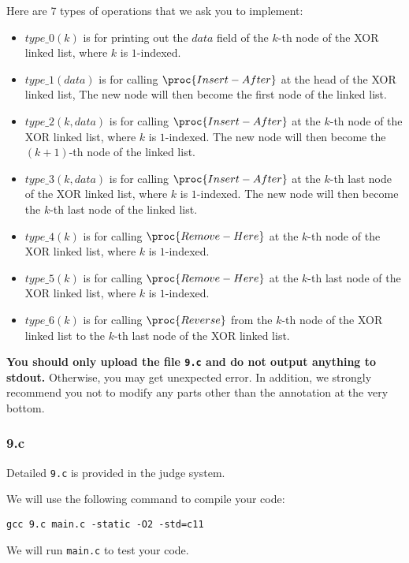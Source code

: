 Here are 7 types of operations that we ask you to implement:

\begin{itemize}
    \item $type\_0(k)$ is for printing out the $data$ field of the $k$-th node of the XOR linked list, where $k$ is $1$-indexed.
    \item $type\_1(data)$ is for calling $\proc{Insert-After}$ at the head of the XOR linked list, The new node will then become the first node of the linked list.
    \item $type\_2(k, data)$ is for calling $\proc{Insert-After}$ at the $k$-th node of the XOR linked list, where $k$ is $1$-indexed. The new node will then become the $(k+1)$-th node of the linked list.
    \item $type\_3(k, data)$ is for calling $\proc{Insert-After}$ at the $k$-th last node of the XOR linked list, where $k$ is $1$-indexed. The new node will then become the $k$-th last node of the linked list.
    \item $type\_4(k)$ is for calling $\proc{Remove-Here}$ at the $k$-th node of the XOR linked list, where $k$ is $1$-indexed.
    \item $type\_5(k)$ is for calling $\proc{Remove-Here}$ at the $k$-th last node of the XOR linked list, where $k$ is $1$-indexed. 
    \item $type\_6(k)$ is for calling $\proc{Reverse}$ from the $k$-th node of the XOR linked list to the $k$-th last node of the XOR linked list.
\end{itemize}

\textbf{You should only upload the file \texttt{9.c} and do not output anything to stdout.} Otherwise, you may get unexpected error. In addition, we strongly recommend you not to modify any parts other than the annotation at the very bottom. 

\subsubsection{9.c}\label{9.c}

Detailed \texttt{9.c} is provided in the judge system.

\noindent We will use the following command to compile your code:

\begin{center}
\texttt{gcc 9.c main.c -static -O2 -std=c11}
\end{center}

\noindent We will run \texttt{main.c} to test your code.

